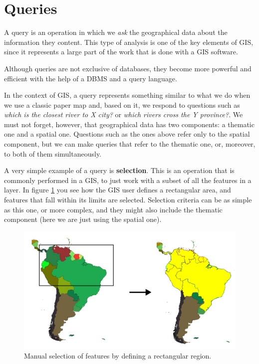 \section{Queries}

A query is an operation in which we \emph{ask} the geographical data about the information they content. This type of analysis is one of the key elements of GIS, since it represents a large part of the work that is done with a GIS software.

Although queries are not exclusive of databases, they become more powerful and efficient with the help of a DBMS and a query language.

In the context of GIS, a query represents something similar to what we do when we use a classic paper map and, based on it, we respond to questions such as \emph{which is the closest river to X city?} or \emph{which rivers cross the Y province?}. We must not forget, however, that geographical data has two components: a thematic one and a spatial one. Questions such as the ones above refer only to the spatial component, but we can make queries that refer to the thematic one, or, moreover, to both of them simultaneously.

A very simple example of a query is \textbf{selection}. This is an operation that is commonly performed in a GIS, to just work with a subset of all the features in a layer. In figure \ref{Fig:Selection} you see how the GIS user defines a rectangular area, and features that fall within its limits are selected. Selection criteria can be as simple as this one, or more complex, and they might also include the thematic component (here we are just using the spatial one).

\begin{figure}[!hbt]   
\centering
\includegraphics[width=\textwidth]{databases/Selection.png}
\caption{\small Manual selection of features by defining a rectangular region.}
\label{Fig:Selection} 
\end{figure}


